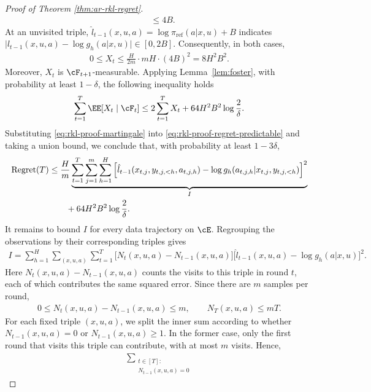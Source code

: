 \documentclass[11pt]{article}
\newcommand{\piref}{\pi_{\text{ref}}}
\begin{document}
\begin{proof}[Proof of Theorem \ref{thm:ar-rkl-regret}]
\begin{align*}
    &\leq 4B.
\end{align*}
At an unvisited triple, 
$\hat l_{t-1}(x,u,a)=\log\piref(a|x,u)+B$ indicates $\big|
        \hat l_{t-1}(x,u,a)-\log g_h(a|x,u)
    \big| \in [0,2B]$. Consequently, in both cases, 
\begin{align*}
    0\leq X_t
    \leq
    \frac{H}{2m}\cdot mH\cdot(4B)^2
    =
    8H^2B^2.
\end{align*}
Moreover, $X_t$ is $\cF_{t+1}$-measurable. Applying
Lemma~\ref{lem:foster}, with probability at least $1-\delta$, the following inequality holds
\begin{align}
    \sum_{t=1}^T\EE[X_t\mid\cF_t]
    \leq
    2\sum_{t=1}^T X_t
    +
    64H^2B^2\log\frac2\delta.
    \label{eq:rkl-proof-martingale}
\end{align}
Substituting \eqref{eq:rkl-proof-martingale} into \eqref{eq:rkl-proof-regret-predictable} and taking a union bound, we conclude
that, with probability at least $1-3\delta$,
\begin{align}
\notag
    \operatorname{Regret}(T)
    &\leq
    \frac Hm
    \underbrace{\sum_{t=1}^T\sum_{j=1}^m\sum_{h=1}^H
    \Big[
        \hat l_{t-1}(x_{t,j},y_{t,j,<h},a_{t,j,h})
        -
        \log g_h(a_{t,j,h}|x_{t,j},y_{t,j,<h})
    \Big]^2}_{I}\\
    &\qquad +
    64H^2B^2\log\frac2\delta.
    \label{eq:rkl-proof-regret-empirical}
\end{align}
It remains to bound $I$ for every data trajectory on $\cE$.
Regrouping the observations by their corresponding triples gives
\begin{align*}
    I
    =
    \sum_{h=1}^H
    \sum_{(x,u,a)}
    \sum_{t=1}^T
    \big[
        N_t(x,u,a)-N_{t-1}(x,u,a)
    \big]
    \Big[
        \hat l_{t-1}(x,u,a)-\log g_h(a|x,u)
    \Big]^2.
\end{align*}
Here $N_t(x,u,a)-N_{t-1}(x,u,a)$ counts the visits to this triple
in round $t$, each of which contributes the same squared error.
Since there are $m$ samples per round,
\begin{align*}
    0
    \leq N_t(x,u,a)-N_{t-1}(x,u,a)
    \leq m,
    \qquad
    N_T(x,u,a)\leq mT.
\end{align*}
For each fixed triple $(x,u,a)$, we split the inner sum according to whether
$N_{t-1}(x,u,a)=0$ or $N_{t-1}(x,u,a)\geq1$.
In the former case, only the first round that visits this triple can contribute, with at most $m$ visits. Hence,
\begin{align*}
    \sum_{\substack{t\in[T]:\\N_{t-1}(x,u,a)=0}}

\end{align*}
\end{proof}
\end{document}
